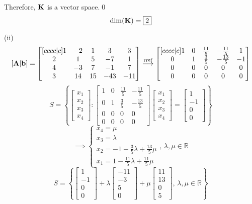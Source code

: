 \documentclass[a4paper]{article}
\begin{document}
Therefore, \(\bf K\) is a vector space.\qed
\[\dim({\bf K})=\boxed2\]

(ii)
\[[{\bf A}|{\bf b}]=
	\begin{bmatrix}[cccc|c]
		1&-2&1&3&3\\
		2&1&5&-7&1\\
		4&-3&7&-1&7\\
		3&14&15&-43&-11
	\end{bmatrix}
\overset{\text{rref}}{\longrightarrow}
	\begin{bmatrix}[cccc|c]
		1&0&\frac{11}5&-\frac{11}5&1\\
		0&1&\frac35&-\frac{13}5&-1\\
		0&0&0&0&0\\
		0&0&0&0&0
	\end{bmatrix}\]
\[S=
	\left\{\begin{bmatrix}x_1\\x_2\\x_3\\x_4\end{bmatrix}:
\begin{bmatrix}
	1&0&\frac{11}5&-\frac{11}5\\
0&1&\frac35&-\frac{13}5\\
0&0&0&0\\
0&0&0&0
\end{bmatrix}
\begin{bmatrix}x_1\\x_2\\x_3\\x_4\end{bmatrix}
=\begin{bmatrix}1\\-1\\0\\0\end{bmatrix}
\right\}\]
\[\implies\begin{cases}
	x_4=\mu\\
	x_3=\lambda\\
	x_2=-1-\frac35\lambda+\frac{13}5\mu\\
	x_1=1-\frac{11}5\lambda+\frac{11}5\mu
\end{cases},\,\lambda,\mu\in\mathbb R\]
\[S=\left\{\begin{bmatrix}1\\-1\\0\\0\end{bmatrix}+
\lambda\begin{bmatrix}-11\\-3\\5\\0\end{bmatrix}+\mu\begin{bmatrix}11\\13\\0\\5\end{bmatrix},\,\lambda,\mu\in\mathbb R\right\}
\]
\end{document}
